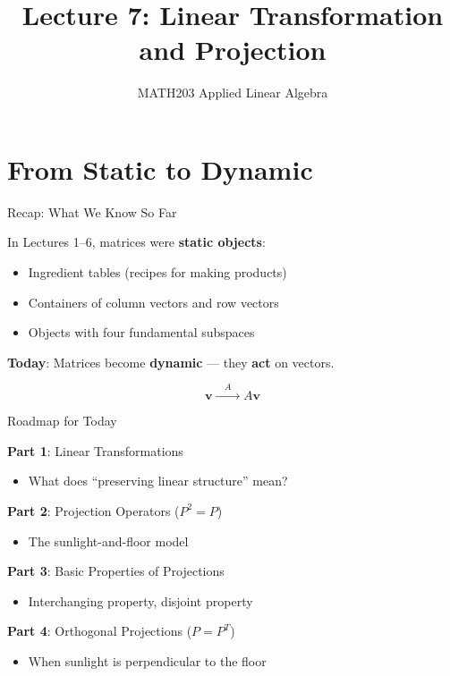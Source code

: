 \documentclass[10pt]{beamer}
\title{Lecture 7: Linear Transformation and Projection}
\subtitle{MATH203 Applied Linear Algebra}
\date{}
\theoremstyle{definition}
\newcommand{\x}[1]{\alert{\textbf{#1}}}
\begin{document}
\maketitle

\section{From Static to Dynamic}

\begin{frame}{Recap: What We Know So Far}

In Lectures 1--6, matrices were \x{static objects}:

\vspace{0.5em}

\begin{itemize}
\item Ingredient tables (recipes for making products)
\item Containers of column vectors and row vectors
\item Objects with four fundamental subspaces
\end{itemize}

\vspace{1em}

\x{Today}: Matrices become \x{dynamic} --- they \x{act} on vectors.

\vspace{1em}

$$\mathbf{v} \xrightarrow{\quad A \quad} A\mathbf{v}$$

\end{frame}

\begin{frame}{Roadmap for Today}

\x{Part 1}: Linear Transformations
\begin{itemize}
\item What does ``preserving linear structure'' mean?
\end{itemize}

\vspace{0.5em}

\x{Part 2}: Projection Operators ($P^2 = P$)
\begin{itemize}
\item The sunlight-and-floor model
\end{itemize}

\vspace{0.5em}

\x{Part 3}: Basic Properties of Projections
\begin{itemize}
\item Interchanging property, disjoint property
\end{itemize}

\vspace{0.5em}

\x{Part 4}: Orthogonal Projections ($P = P^T$)
\begin{itemize}
\item When sunlight is perpendicular to the floor
\end{itemize}

\end{frame}
\end{document}
